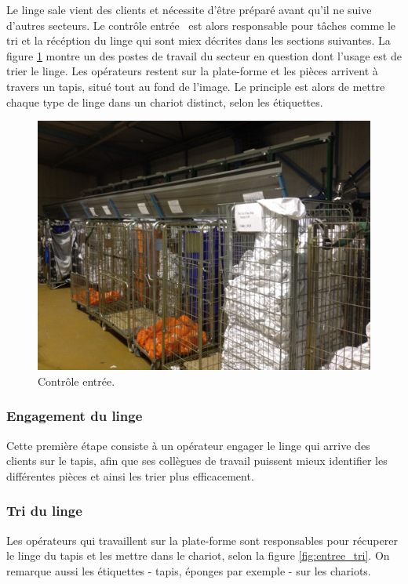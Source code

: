 \documentclass{article}
\newcommand{\rapportFigure}{0.075}
\begin{document}
Le linge sale vient des clients et nécessite d'être préparé avant qu'il ne suive
d'autres secteurs. Le \og contrôle entrée \fg~est alors responsable pour tâches
comme le tri et la récéption du linge qui sont miex décrites dans les sections
suivantes. La figure \ref{fig:entree} montre un des postes de travail du secteur
en question dont l'usage est de trier le linge. Les opérateurs restent sur la
plate-forme et les pièces arrivent à travers un tapis, situé tout au fond de
l'image. Le principle est alors de mettre chaque type de linge dans un chariot
distinct, selon les étiquettes.
%
\begin{figure}[h]
    \centering
    \includegraphics[scale= \rapportFigure]{images/entree}
    \caption{Contrôle entrée.}
    \label{fig:entree}
\end{figure}
%


\subsubsection{Engagement du linge}

Cette première étape consiste à un opérateur engager le linge qui arrive des
clients sur le tapis, afin que ses collègues de travail puissent mieux
identifier les différentes pièces et ainsi les trier plus efficacement.

\subsubsection{Tri du linge}

Les opérateurs qui travaillent sur la plate-forme sont responsables pour
récuperer le linge du tapis et les mettre dans le chariot, selon la
figure \ref{fig:entree_tri}. On remarque aussi les étiquettes - tapis, éponges
par exemple - sur les chariots.
\end{document}
